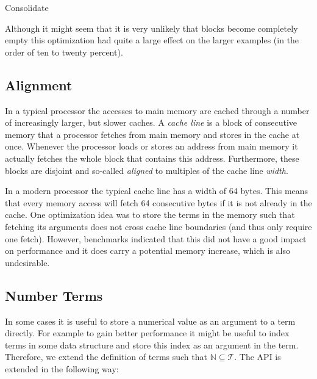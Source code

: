 \documentclass[10pt,a4paper]{article}
\theoremstyle{definition}
\newcommand{\naturalnumbers}{\mathbb{N}}
\newcommand{\terms}{\mathcal{T}}
\renewcommand{\gets}{:=}
\begin{document}
\begin{algorithm}[H]
  \caption{Consolidate}\label{alg:consolidate}
  \begin{algorithmic}[1]
      \State {slot $\gets \top$}
    \EndFor
    
      \label{alg:consolidate:erase}
      \Else
          \EndIf
       \EndFor
      \EndIf
    \EndFor
    \EndProcedure
  \end{algorithmic}
\end{algorithm}

\noindent Although it might seem that it is very unlikely that blocks become completely empty this optimization had quite a large effect on the larger examples (in the order of ten to twenty percent).

\subsection{Alignment}

In a typical processor the accesses to main memory are cached through a number of increasingly larger, but slower caches. 
A \emph{cache line} is a block of consecutive memory that a processor fetches from main memory and stores in the cache at once. 
Whenever the processor loads or stores an address from main memory it actually fetches the whole block that contains this address.
Furthermore, these blocks are disjoint and so-called \emph{aligned} to multiples of the cache line \emph{width}.

In a modern processor the typical cache line has a width of 64 bytes.
This means that every memory access will fetch 64 consecutive bytes if it is not already in the cache. 
One optimization idea was to store the terms in the memory such that fetching its arguments does not cross cache line boundaries (and thus only require one fetch).
However, benchmarks indicated that this did not have a good impact on performance and it does carry a potential memory increase, which is also undesirable.

\subsection{Number Terms}

In some cases it is useful to store a numerical value as an argument to a term directly.
For example to gain better performance it might be useful to index terms in some data structure and store this index as an argument in the term.
Therefore, we extend the definition of terms such that $\naturalnumbers \subseteq \terms$.
The API is extended in the following way:
\end{document}
